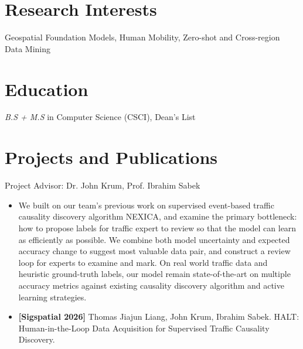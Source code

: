 \documentclass{resume}
\begin{document}



\section{Research Interests}
Geospatial Foundation Models, Human Mobility, Zero-shot and Cross-region Data Mining

\section{Education}
\textit{B.S + M.S} in Computer Science (CSCI), Dean's List

\section{Projects and Publications}

Project Advisor: Dr. John Krum, Prof. Ibrahim Sabek
\begin{itemize}
\item We built on our team's previous work on supervised event-based traffic causality discovery algorithm NEXICA, and examine the primary bottleneck: how to propose labels for traffic expert to review so that the model can learn as efficiently as possible. We combine both model uncertainty and expected accuracy change to suggest most valuable data pair, and construct a review loop for experts to examine and mark. On real world traffic data and heuristic ground-truth labels, our model remain state-of-the-art on multiple accuracy metrics against existing causality discovery algorithm and active learning strategies.
\item \textbf{[Sigspatial 2026]} Thomas Jiajun Liang, John Krum, Ibrahim Sabek. HALT: Human-in-the-Loop Data Acquisition for Supervised Traffic Causality Discovery.
\end{itemize}
\end{document}
